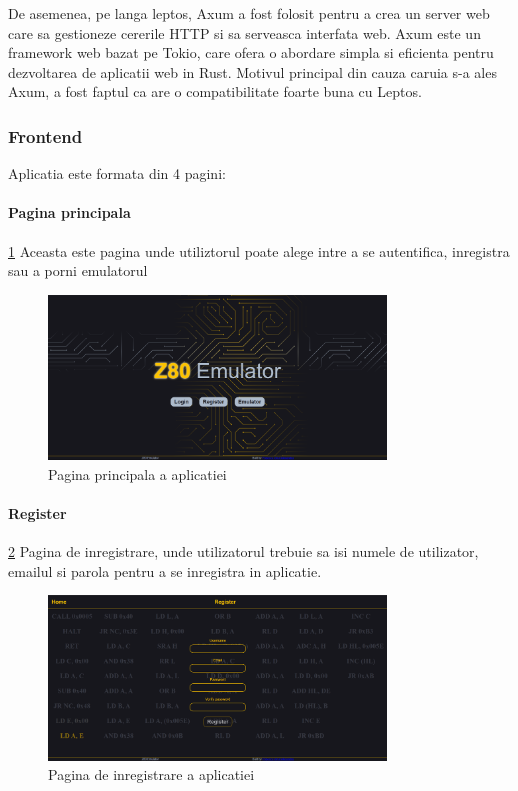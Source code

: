 \documentclass[titlepage,12pt]{article}
\begin{document}
De asemenea, pe langa leptos, Axum a fost folosit pentru a crea un server web care sa gestioneze cererile HTTP si sa serveasca interfata web. Axum este un framework web bazat pe Tokio, care ofera o abordare simpla si eficienta pentru dezvoltarea de aplicatii web in Rust.
Motivul principal din cauza caruia s-a ales Axum, a fost faptul ca are o compatibilitate foarte buna cu Leptos.

\subsubsection{Frontend}

Aplicatia este formata din 4 pagini:
\paragraph {Pagina principala} \cref {fig:homepage} Aceasta este pagina unde utiliztorul poate alege intre a se autentifica, inregistra sau a porni emulatorul
\begin{figure}[h!]
\centering
\includegraphics[width=0.8\textwidth]{images/homepage.png}
\caption{Pagina principala a aplicatiei}
\label{fig:homepage}
\end{figure}

\paragraph {Register} \cref {fig:registerpage} Pagina de inregistrare, unde utilizatorul trebuie sa isi numele de utilizator, emailul si parola pentru a se inregistra in aplicatie.
\begin{figure}[h!]
\centering
\includegraphics[width=0.8\textwidth]{images/registerpage.png}
\caption{Pagina de inregistrare a aplicatiei}
\label{fig:registerpage}
\end{figure}
\end{document}

